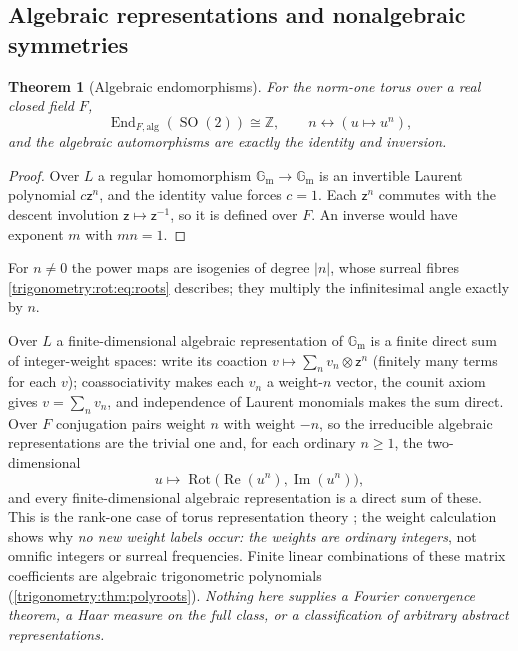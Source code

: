 \documentclass[11pt,letterpaper]{article}
\numberwithin{equation}{section}
\newtheorem{theorem}{Theorem}[section]
\theoremstyle{definition}
\theoremstyle{remark}
\newcommand{\Z}{\mathbb Z}
\newcommand{\re}{\operatorname{Re}}
\newcommand{\im}{\operatorname{Im}}
\newcommand{\SO}{\operatorname{SO}}
\newcommand{\End}{\operatorname{End}}
\newcommand{\Rot}{\operatorname{Rot}}
\newcommand{\Gm}{\mathbb G_{\mathrm m}}
\begin{document}
\subsection{Algebraic representations and nonalgebraic symmetries}
\label{trigonometry:rot:sec:representations}

\begin{theorem}[Algebraic endomorphisms]\label{trigonometry:rot:thm:endomorphisms}
For the norm-one torus over a real closed field $F$,
\begin{equation}\label{trigonometry:rot:eq:endomorphisms}
 \End_{F,\mathrm{alg}}(\SO(2))\cong\Z,\qquad n\longleftrightarrow(u\mapsto u^n),
\end{equation}
and the algebraic automorphisms are exactly the identity and inversion.
\end{theorem}
\begin{proof}
Over $L$ a regular homomorphism $\Gm\to\Gm$ is an invertible Laurent polynomial $c\mathsf z^n$, and
the identity value forces $c=1$. Each $\mathsf z^n$ commutes with the descent involution
$\mathsf z\mapsto\mathsf z^{-1}$, so it is defined over $F$. An inverse would have exponent $m$ with
$mn=1$.
\end{proof}
For $n\ne0$ the power maps are isogenies of degree $|n|$, whose surreal fibres
\cref{trigonometry:rot:eq:roots} describes; they multiply the infinitesimal angle exactly by $n$.

Over $L$ a finite-dimensional algebraic representation of $\Gm$ is a finite direct sum of
integer-weight spaces: write its coaction $v\mapsto\sum_nv_n\otimes\mathsf z^n$ (finitely many terms
for each $v$); coassociativity makes each $v_n$ a weight-$n$ vector, the counit axiom gives
$v=\sum_nv_n$, and independence of Laurent monomials makes the sum direct. Over $F$ conjugation pairs
weight $n$ with weight $-n$, so the irreducible algebraic representations are the trivial one and,
for each ordinary $n\ge1$, the two-dimensional
\begin{equation}\label{trigonometry:rot:eq:weightrep}
 u\longmapsto\Rot\bigl(\re(u^n),\im(u^n)\bigr),
\end{equation}
and every finite-dimensional algebraic representation is a direct sum of these. This is the rank-one
case of torus representation theory \cite[\S12h]{Milne}; the weight calculation shows why \emph{no
new weight labels occur: the weights are ordinary integers}, not omnific integers or surreal
frequencies. Finite linear combinations of these matrix coefficients are algebraic trigonometric
polynomials (\cref{trigonometry:thm:polyroots}). \emph{Nothing here supplies a Fourier convergence
theorem, a Haar measure on the full class, or a classification of arbitrary abstract
representations.}
\end{document}

